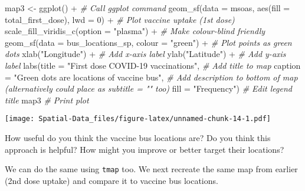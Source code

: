 \documentclass[
]{book}
\newenvironment{Shaded}{\begin{snugshade}}{\end{snugshade}}
\newcommand{\AttributeTok}[1]{\textcolor[rgb]{0.77,0.63,0.00}{#1}}
\newcommand{\CommentTok}[1]{\textcolor[rgb]{0.56,0.35,0.01}{\textit{#1}}}
\newcommand{\DecValTok}[1]{\textcolor[rgb]{0.00,0.00,0.81}{#1}}
\newcommand{\FunctionTok}[1]{\textcolor[rgb]{0.00,0.00,0.00}{#1}}
\newcommand{\NormalTok}[1]{#1}
\newcommand{\OtherTok}[1]{\textcolor[rgb]{0.56,0.35,0.01}{#1}}
\newcommand{\SpecialCharTok}[1]{\textcolor[rgb]{0.00,0.00,0.00}{#1}}
\newcommand{\StringTok}[1]{\textcolor[rgb]{0.31,0.60,0.02}{#1}}
\begin{document}
\begin{Shaded}
\begin{Highlighting}[]
\NormalTok{map3 }\OtherTok{\textless{}{-}} \FunctionTok{ggplot}\NormalTok{() }\SpecialCharTok{+} \CommentTok{\# Call ggplot command}
            \FunctionTok{geom\_sf}\NormalTok{(}\AttributeTok{data =}\NormalTok{ msoas, }\FunctionTok{aes}\NormalTok{(}\AttributeTok{fill =}\NormalTok{ total\_first\_dose), }\AttributeTok{lwd =} \DecValTok{0}\NormalTok{) }\SpecialCharTok{+} \CommentTok{\# Plot vaccine uptake (1st dose)}
            \FunctionTok{scale\_fill\_viridis\_c}\NormalTok{(}\AttributeTok{option =} \StringTok{"plasma"}\NormalTok{) }\SpecialCharTok{+} \CommentTok{\# Make colour{-}blind friendly}
            \FunctionTok{geom\_sf}\NormalTok{(}\AttributeTok{data =}\NormalTok{ bus\_locations\_sp, }\AttributeTok{colour =} \StringTok{"green"}\NormalTok{) }\SpecialCharTok{+} \CommentTok{\# Plot points as green dots}
            \FunctionTok{xlab}\NormalTok{(}\StringTok{"Longitude"}\NormalTok{) }\SpecialCharTok{+} \CommentTok{\# Add x{-}axis label}
            \FunctionTok{ylab}\NormalTok{(}\StringTok{"Latitude"}\NormalTok{) }\SpecialCharTok{+} \CommentTok{\# Add y{-}axis label}
            \FunctionTok{labs}\NormalTok{(}\AttributeTok{title =} \StringTok{"First dose COVID{-}19 vaccinations"}\NormalTok{, }\CommentTok{\# Add title to map}
                 \AttributeTok{caption =} \StringTok{"Green dots are locations of vaccine bus"}\NormalTok{, }\CommentTok{\# Add description to bottom of map (alternatively could place as subtitle = "" too)}
                 \AttributeTok{fill =} \StringTok{"Frequency"}\NormalTok{) }\CommentTok{\# Edit legend title}
\NormalTok{map3 }\CommentTok{\# Print plot}
\end{Highlighting}
\end{Shaded}

\texttt{[image: Spatial-Data\_files/figure-latex/unnamed-chunk-14-1.pdf]}

How useful do you think the vaccine bus locations are? Do you think this approach is helpful? How might you improve or better target their locations?

We can do the same using \texttt{tmap} too. We next recreate the same map from earlier (2nd dose uptake) and compare it to vaccine bus locations.
\end{document}
